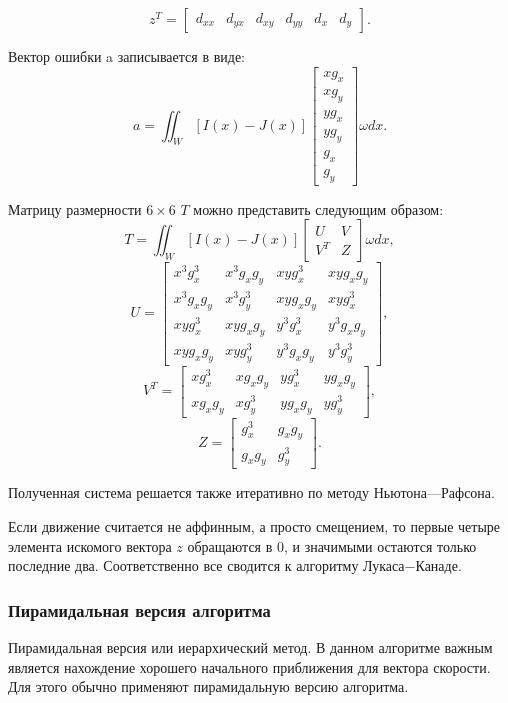 $$z^T=\begin{bmatrix}
 d_{xx} & d_{yx} & d_{xy} & d_{yy} & d_x & d_y
\end{bmatrix}.$$

Вектор ошибки a записывается в виде:
$$a=\iint_W [I(x)-J(x)]\begin{bmatrix}
xg_x\\
xg_y\\
yg_x\\
yg_y\\
g_x\\
g_y
\end{bmatrix}\omega dx.$$

Матрицу размерности $6 \times 6$ $T$ можно представить следующим образом:
$$T=\iint_W [I(x)-J(x)]\begin{bmatrix}
U & V\\
V^T & Z
\end{bmatrix}\omega dx,$$
$$U=\begin{bmatrix}
x^3 g^3_x & x^3 g_x g_y & x y g^3_x & x y g_x g_y \\
x^3g_xg_y & x^3g^3_y & xyg_xg_y & xyg^3_x \\
xyg^3_x & xyg_xg_y & y^3g^3_x & y^3g_xg_y \\
xyg_xg_y & xyg^3_y & y^3g_xg_y & y^3g^3_y
\end{bmatrix},$$
$$V^T=\begin{bmatrix}
xg^3_x & xg_xg_y & yg^3_x & yg_xg_y \\
xg_xg_y & xg^3_y & yg_xg_y & yg^3_y
\end{bmatrix},$$
$$Z=\begin{bmatrix}
g^3_x & g_xg_y \\
g_xg_y & g^3_y
\end{bmatrix}.$$

Полученная система решается также итеративно по методу Ньютона—Рафсона.

Если движение считается не аффинным, а просто смещением, то первые четыре элемента искомого вектора $z$ обращаются в 0, и значимыми остаются только последние два. Соответственно все сводится к алгоритму Лукаса−Канаде.
\subsubsection{Пирамидальная версия алгоритма}
\label{subsec:pyramid}
Пирамидальная версия или иерархический метод. В данном алгоритме важным является нахождение хорошего начального приближения для вектора скорости. Для этого обычно применяют пирамидальную версию алгоритма. 

